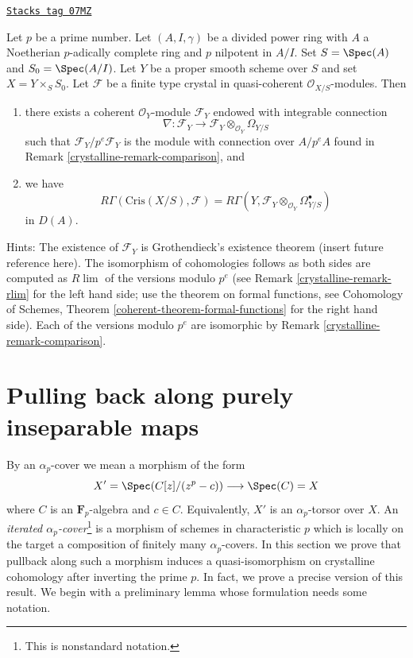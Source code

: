 \begin{remark}

\label{crystalline-remark-complete-comparison}
\href{https://stacks.math.columbia.edu/tag/07MZ}{\texttt{Stacks tag 07MZ}}

Let $p$ be a prime number. Let $(A, I, \gamma)$ be a divided power
ring with $A$ a Noetherian $p$-adically complete ring and $p$ nilpotent
in $A/I$. Set $S = \Spec(A)$ and
$S_0 = \Spec(A/I)$. Let $Y$ be a proper smooth scheme over $S$ and set
$X = Y \times_S S_0$. Let $\mathcal{F}$ be a finite type crystal in
quasi-coherent $\mathcal{O}_{X/S}$-modules. Then
\begin{enumerate}
\item there exists a coherent $\mathcal{O}_Y$-module $\mathcal{F}_Y$
endowed with integrable connection
$$
\nabla :
\mathcal{F}_Y
\longrightarrow
\mathcal{F}_Y \otimes_{\mathcal{O}_Y} \Omega_{Y/S}
$$
such that $\mathcal{F}_Y/p^e\mathcal{F}_Y$ is the module with connection
over $A/p^eA$ found in Remark \ref{crystalline-remark-comparison}, and
\item we have
$$
R\Gamma(\text{Cris}(X/S), \mathcal{F}) =
R\Gamma(Y, \mathcal{F}_Y \otimes_{\mathcal{O}_Y} \Omega^\bullet_{Y/S})
$$
in $D(A)$.
\end{enumerate}
Hints: The existence of $\mathcal{F}_Y$ is Grothendieck's existence theorem
(insert future reference here). The isomorphism of cohomologies follows
as both sides are computed as $R\lim$ of the versions modulo $p^e$
(see Remark \ref{crystalline-remark-rlim} for the left hand side; use the theorem
on formal functions, see
Cohomology of Schemes, Theorem \ref{coherent-theorem-formal-functions}
for the right hand side).
Each of the versions modulo $p^e$ are isomorphic by
Remark \ref{crystalline-remark-comparison}.
\end{remark}

\section{Pulling back along purely inseparable maps}
\label{crystalline-section-pull-back-along-pth-root}
By an $\alpha_p$-cover we mean a morphism of the form
$$
X' = \Spec(C[z]/(z^p - c)) \longrightarrow \Spec(C) = X
$$
where $C$ is an $\mathbf{F}_p$-algebra and $c \in C$. Equivalently,
$X'$ is an $\alpha_p$-torsor over $X$. An {\it iterated
$\alpha_p$-cover}\footnote{This is nonstandard notation.}
is a morphism of schemes in characteristic
$p$ which is locally on the target a composition of finitely many
$\alpha_p$-covers. In this section we prove that pullback along
such a morphism induces a quasi-isomorphism on crystalline cohomology
after inverting the prime $p$. In fact, we prove a precise version
of this result. We begin with a preliminary lemma whose formulation
needs some notation.

